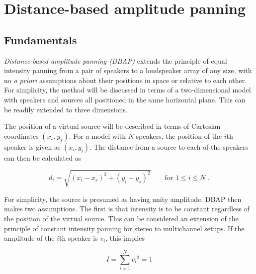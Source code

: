 \documentclass[twoside,10pt]{article}
\begin{document}
%
%

\section{Distance-based amplitude panning}

\subsection{Fundamentals}


\textit{Distance-based amplitude panning (DBAP)} extends the principle of equal intensity panning from a pair of speakers to a loudspeaker array of any size, with no \textit{a priori} assumptions about their positions in space or relative to each other.
For simplicity, the method will be discussed in terms of a two-dimensional model with speakers and sources all positioned in the same horizontal plane. This can be readily extended to three dimensions.

The position of a virtual source will be described in terms of Cartesian coordinates $(x_{s}, y_{s})$. For a model with $N$ speakers, the position of the $i$th speaker is given as $(x_{i}, y_{i})$. The distance from a source to each of the speakers can then be calculated as

\begin{equation} \label{eq:distance}
d_{i} = \sqrt{ {(x_{i} - x_{s})}^2 + {(y_{i} - y_{s})}^2 } \qquad \textrm{for } 1 \leq i \leq N \textrm{ .}
\end{equation}

For simplicity, the source is presumed as having unity amplitude. DBAP then makes two assumptions. The first is that intensity is to be constant regardless of the position of the virtual source. This can be considered an extension of the principle of constant intensity panning for stereo to multichannel setups. If the amplitude of the $i$th speaker is $v_{i}$, this implies

\begin{equation} \label{eq:constant_intensity}
I = \sum_{i=1}^{N} {v_{i}}^2 = 1
\end{equation}
\end{document}
